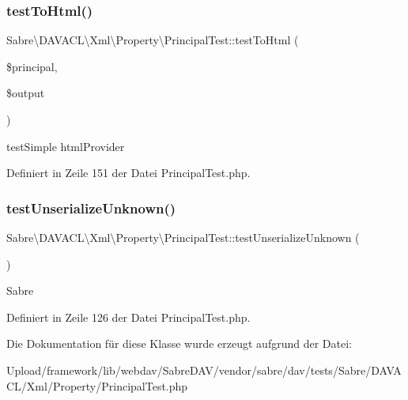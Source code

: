 \subsubsection{\texorpdfstring{test\+To\+Html()}{testToHtml()}}
{\footnotesize\ttfamily Sabre\textbackslash{}\+D\+A\+V\+A\+C\+L\textbackslash{}\+Xml\textbackslash{}\+Property\textbackslash{}\+Principal\+Test\+::test\+To\+Html (\begin{DoxyParamCaption}\item[{}]{\$principal,  }\item[{}]{\$output }\end{DoxyParamCaption})}

test\+Simple  html\+Provider 

Definiert in Zeile 151 der Datei Principal\+Test.\+php.

\mbox{\label{class_sabre_1_1_d_a_v_a_c_l_1_1_xml_1_1_property_1_1_principal_test_a7887317966df815c67c49319655e7bd7}} 
\subsubsection{\texorpdfstring{test\+Unserialize\+Unknown()}{testUnserializeUnknown()}}
{\footnotesize\ttfamily Sabre\textbackslash{}\+D\+A\+V\+A\+C\+L\textbackslash{}\+Xml\textbackslash{}\+Property\textbackslash{}\+Principal\+Test\+::test\+Unserialize\+Unknown (\begin{DoxyParamCaption}{ }\end{DoxyParamCaption})}

Sabre 

Definiert in Zeile 126 der Datei Principal\+Test.\+php.



Die Dokumentation für diese Klasse wurde erzeugt aufgrund der Datei\+:\begin{DoxyCompactItemize}
\item 
Upload/framework/lib/webdav/\+Sabre\+D\+A\+V/vendor/sabre/dav/tests/\+Sabre/\+D\+A\+V\+A\+C\+L/\+Xml/\+Property/Principal\+Test.\+php\end{DoxyCompactItemize}
